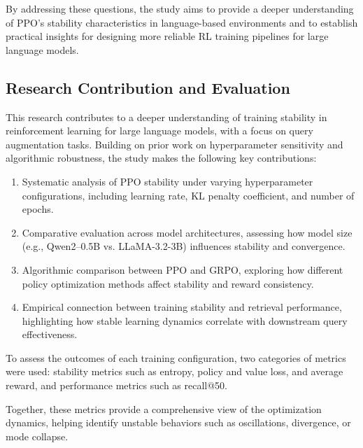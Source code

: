 By addressing these questions, the study aims to provide a deeper understanding of PPO’s stability characteristics in language-based environments and to establish practical insights for designing more reliable RL training pipelines for large language models.

\subsection{Research Contribution and Evaluation}
This research contributes to a deeper understanding of training stability in reinforcement learning for large language models, with a focus on query augmentation tasks. Building on prior work on hyperparameter sensitivity and algorithmic robustness, the study makes the following key contributions:
\begin{enumerate}
    \item Systematic analysis of PPO stability under varying hyperparameter configurations, including learning rate, KL penalty coefficient, and number of epochs.
    \item Comparative evaluation across model architectures, assessing how model size (e.g., Qwen2–0.5B vs. LLaMA-3.2-3B) influences stability and convergence.
    \item Algorithmic comparison between PPO and GRPO, exploring how different policy optimization methods affect stability and reward consistency.
    \item Empirical connection between training stability and retrieval performance, highlighting how stable learning dynamics correlate with downstream query effectiveness.
\end{enumerate}

To assess the outcomes of each training configuration, two categories of metrics were used: stability metrics such as entropy, policy and value loss, and average reward, and performance metrics such as recall@50. 

Together, these metrics provide a comprehensive view of the optimization dynamics, helping identify unstable behaviors such as oscillations, divergence, or mode collapse.


